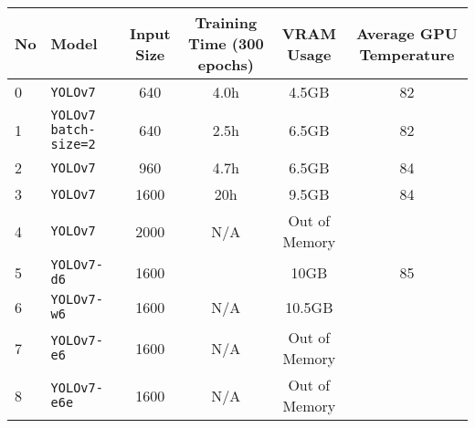 \begin{tabular}{ l l c c c c}
  \toprule[1.5pt]
  No & Model                                       &  Input Size   &Training Time (300 epochs)    &VRAM Usage & Average GPU Temperature \\
  \midrule
  0  & \texttt{YOLOv7}                             &     640       & 4.0h                         &4.5GB          &  82                     \\
  1  & \texttt{YOLOv7 batch-size=2}                &     640       & 2.5h                         &6.5GB          &  82                     \\
  2  & \texttt{YOLOv7}                             &     960       & 4.7h                         &6.5GB          &  84                     \\
  3  & \texttt{YOLOv7}                             &     1600      & 20h                          &9.5GB          &   84                    \\
  4  & \texttt{YOLOv7}                             &     2000      & N/A                          &Out of Memory  &                         \\
  5  & \texttt{YOLOv7-d6}                          &     1600      &                              &10GB           &  85                     \\
  6  & \texttt{YOLOv7-w6}                          &     1600      & N/A                          &10.5GB         &                         \\
  7  & \texttt{YOLOv7-e6}                          &     1600      & N/A                          &Out of Memory  &                         \\
  8  & \texttt{YOLOv7-e6e}                         &     1600      & N/A                          &Out of Memory  &                         \\
  \bottomrule[1.5pt]
\end{tabular}